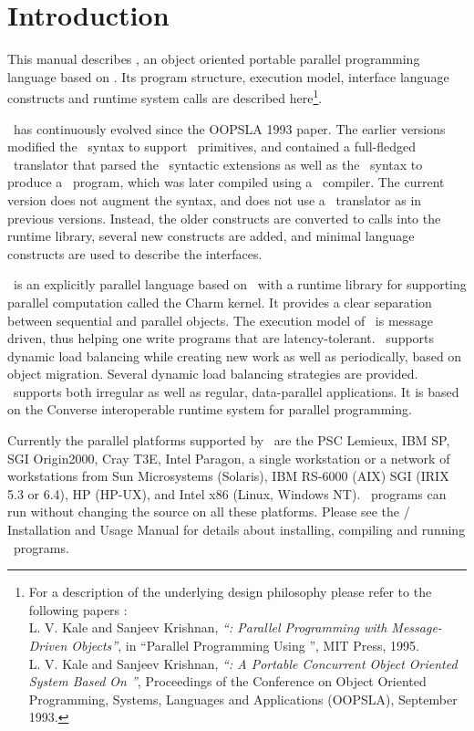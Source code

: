 \section{Introduction}

This manual describes \charmpp, an object oriented portable parallel
programming language based on \CC. Its program structure, execution
model, interface language constructs and runtime system calls are
described here\footnote{For a description of the underlying design
philosophy please refer to the following papers :\\
    L. V. Kale and Sanjeev Krishnan,
    {\em ``\charmpp : Parallel Programming with Message-Driven Objects''},
    in ``Parallel Programming Using \CC'',
    MIT Press, 1995. \\
    L. V. Kale and Sanjeev Krishnan,
    {\em ``\charmpp : A Portable Concurrent Object Oriented System
    Based On \CC''},
    Proceedings of the Conference on Object Oriented Programming,
    Systems, Languages and Applications (OOPSLA), September 1993.
}.

\charmpp\ has continuously evolved since the OOPSLA 1993 paper.  The earlier
versions modified the \CC\ syntax to support \charmpp\ primitives, and
contained a full-fledged \charmpp\ translator that parsed the \charmpp\
syntactic extensions as well as the \CC\ syntax to produce a \CC\ program,
which was later compiled using a \CC\ compiler.  The current version does not
augment the \CC{} syntax, and does not use a \charmpp\ translator as in previous
versions. Instead, the older constructs are converted to calls into the runtime
library, several new constructs are added, and minimal language constructs are
used to describe the interfaces.

\charmpp\ is an explicitly parallel language based on \CC\ with a runtime
library for supporting parallel computation called the Charm kernel.  It
provides a clear separation between sequential and parallel objects.  The
execution model of \charmpp\ is message driven, thus helping one write programs
that are latency-tolerant.  \charmpp\ supports dynamic load balancing while
creating new work as well as periodically, based on object migration.  Several
dynamic load balancing strategies are provided.  \charmpp\ supports both
irregular as well as regular, data-parallel applications.  It is based on the
{\sc Converse} interoperable runtime system for parallel programming.

Currently the parallel platforms supported by \charmpp\ are the PSC Lemieux, 
IBM SP, SGI
Origin2000, Cray T3E, Intel Paragon, a single workstation or a network of
workstations from Sun Microsystems (Solaris), IBM RS-6000 (AIX) SGI (IRIX 5.3
or 6.4), HP (HP-UX), and Intel x86 (Linux, Windows NT).  \charmpp\ programs can
run without changing the source on all these platforms.  Please see the
\charmpp{}/\converse{} Installation and Usage Manual for details about
installing, compiling and running \charmpp\ programs.

